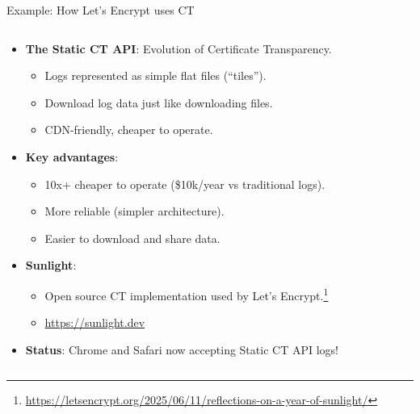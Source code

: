 \documentclass[aspectratio=169, lualatex, handout]{beamer}
\begin{document}
\begin{frame}{Example: How Let's Encrypt uses CT}
	\begin{columns}[c]
		\begin{column}{1\textwidth}
			\begin{itemize}
				\item \textbf{The Static CT API}: Evolution of Certificate Transparency.
				      \begin{itemize}
					      \item Logs represented as simple flat files (``tiles'').
					      \item Download log data just like downloading files.
					      \item CDN-friendly, cheaper to operate.
				      \end{itemize}
				\item \textbf{Key advantages}:
				      \begin{itemize}
					      \item 10x+ cheaper to operate (\approx\$10k/year vs traditional logs).
					      \item More reliable (simpler architecture).
					      \item Easier to download and share data.
				      \end{itemize}
				\item \textbf{Sunlight}:
				      \begin{itemize}
					      \item Open source CT implementation used by Let's Encrypt.\footnote{\url{https://letsencrypt.org/2025/06/11/reflections-on-a-year-of-sunlight/}}
					      \item \url{https://sunlight.dev}
				      \end{itemize}
				\item \textbf{Status}: Chrome and Safari now accepting Static CT API logs!
			\end{itemize}
		\end{column}
	\end{columns}
\end{frame}
\end{document}
